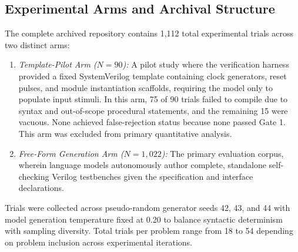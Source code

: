 \documentclass[conference]{IEEEtran}
\begin{document}
\subsection{Experimental Arms and Archival Structure}
The complete archived repository contains 1,112 total experimental trials across two distinct arms:
\begin{enumerate}
    \item \textit{Template-Pilot Arm ($N=90$):} A pilot study where the verification harness provided a fixed SystemVerilog template containing clock generators, reset pulses, and module instantiation scaffolds, requiring the model only to populate input stimuli. In this arm, 75 of 90 trials failed to compile due to syntax and out-of-scope procedural statements, and the remaining 15 were vacuous. None achieved false-rejection status because none passed Gate 1. This arm was excluded from primary quantitative analysis.
    \item \textit{Free-Form Generation Arm ($N=1,022$):} The primary evaluation corpus, wherein language models autonomously author complete, standalone self-checking Verilog testbenches given the specification and interface declarations.
\end{enumerate}

Trials were collected across pseudo-random generator seeds 42, 43, and 44 with model generation temperature fixed at 0.20 to balance syntactic determinism with sampling diversity. Total trials per problem range from 18 to 54 depending on problem inclusion across experimental iterations.
\end{document}
